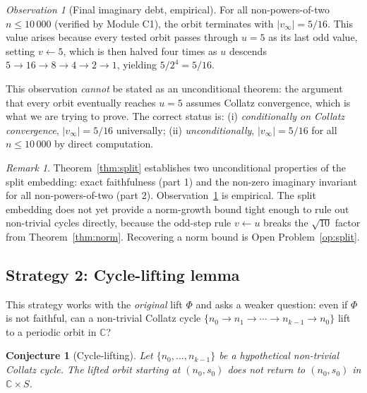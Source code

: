 \documentclass[12pt,reqno]{amsart}
\theoremstyle{plain}
\newtheorem{conjecture}[theorem]{Conjecture}
\theoremstyle{definition}
\theoremstyle{remark}
\newtheorem{remark}[theorem]{Remark}
\newtheorem{observation}[theorem]{Observation}
\newcommand{\CC}{\mathbb{C}}
\newcommand{\abs}[1]{\left|#1\right|}
\begin{document}
\begin{observation}[Final imaginary debt, empirical]
\label{obs:debt}
For all non-powers-of-two $n \leq 10\,000$ (verified by Module C1),
the orbit terminates with $\abs{v_\infty} = 5/16$.  This value arises
because every tested orbit passes through $u = 5$ as its last odd value,
setting $v \leftarrow 5$, which is then halved four times as $u$ descends
$5 \to 16 \to 8 \to 4 \to 2 \to 1$, yielding $5/2^4 = 5/16$.

This observation \emph{cannot} be stated as an unconditional theorem: the
argument that every orbit eventually reaches $u = 5$ assumes Collatz
convergence, which is what we are trying to prove.  The correct status
is: (i) \emph{conditionally on Collatz convergence}, $\abs{v_\infty} = 5/16$
universally; (ii) \emph{unconditionally}, $\abs{v_\infty} = 5/16$ for
all $n \leq 10\,000$ by direct computation.
\end{observation}

\begin{remark}
Theorem~\ref{thm:split} establishes two unconditional properties of the
split embedding: exact faithfulness (part 1) and the non-zero imaginary
invariant for all non-powers-of-two (part 2).  Observation~\ref{obs:debt}
is empirical.  The split embedding does not yet provide a norm-growth
bound tight enough to rule out non-trivial cycles directly, because the
odd-step rule $v \leftarrow u$ breaks the $\sqrt{10}$ factor from
Theorem~\ref{thm:norm}.  Recovering a norm bound is
Open Problem~\ref{op:split}.
\end{remark}

\subsection{Strategy 2: Cycle-lifting lemma}
\label{sec:cycle}

This strategy works with the \emph{original} lift $\Phi$ and asks a
weaker question: even if $\Phi$ is not faithful, can a non-trivial
Collatz cycle $\{n_0 \to n_1 \to \cdots \to n_{k-1} \to n_0\}$ lift
to a periodic orbit in $\CC$?

\begin{conjecture}[Cycle-lifting]
\label{conj:cycle}
Let $\{n_0, \ldots, n_{k-1}\}$ be a hypothetical non-trivial Collatz
cycle.  The lifted orbit starting at $(n_0, s_0)$ does not return
to $(n_0, s_0)$ in $\CC \times S$.
\end{conjecture}
\end{document}
